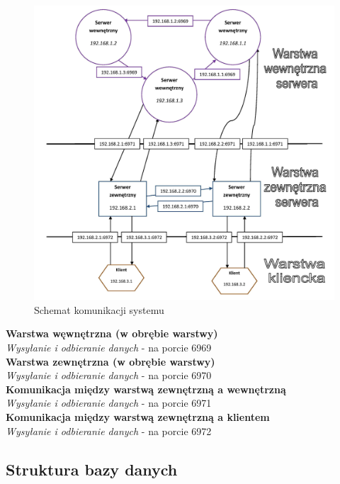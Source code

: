 {\begin{figure}[h!tb]
\begin{center}
\includegraphics[width=0.9\linewidth]{img/komunikacja_schemat.jpg} 
\caption{Schemat komunikacji systemu}
\label{img:schem_kom}
\end{center}
\end{figure}

\textbf{Warstwa węwnętrzna (w obrębie warstwy)} \\
\textit{Wysyłanie i odbieranie danych} - na porcie 6969 \\

\textbf{Warstwa zewnętrzna (w obrębie warstwy)} \\
\textit{Wysyłanie i odbieranie danych} - na porcie 6970 \\


\textbf{Komunikacja między warstwą zewnętrzną a wewnętrzną} \\
\textit{Wysyłanie i odbieranie danych} - na porcie 6971 \\


\textbf{Komunikacja między warstwą zewnętrzną a klientem} \\
\textit{Wysyłanie i odbieranie danych} - na porcie 6972 \\

\subsection[Struktura bazy danych]{Struktura bazy danych}

}
